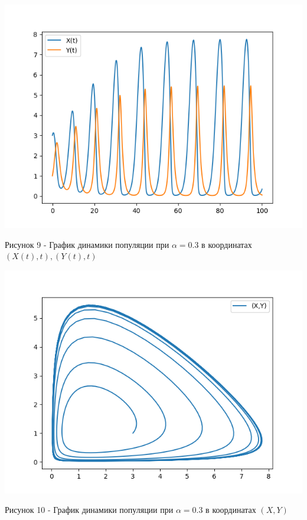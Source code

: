\documentclass[a4paper,14pt]{extreport}
\begin{document}
\begin{center}
    \begin{minipage}[htb]{0.8\linewidth}
    \includegraphics[width=14cm]{n7.png}
    \end{minipage}
    \end{center}
    \begin{center}
        Рисунок 9 - График динамики популяции при $\alpha = 0.3$ в координатах $(X(t),t),(Y(t),t)$
    \end{center}
    \begin{center}
    \begin{minipage}[htb]{0.8\linewidth}
    \includegraphics[width=14cm]{7.png}
    \end{minipage}
    \end{center}
    \begin{center}
        Рисунок 10 - График динамики популяции при $\alpha = 0.3$ в координатах $(X,Y)$  
    \end{center}
\end{document}
